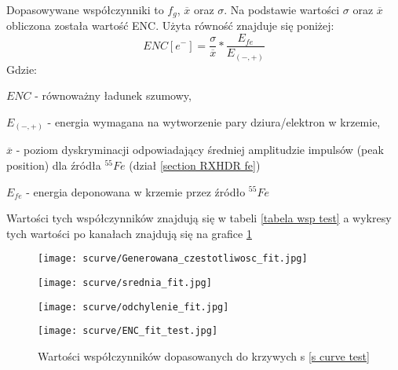 Dopasowywane współczynniki to $f_g$, $\overline{x}$ oraz $\sigma$. Na podstawie wartości $\sigma$ oraz $\overline{x}$ obliczona została wartość ENC. Użyta równość znajduje się poniżej:
\begin{equation}
        ENC [e^-] = \frac{\sigma}{\overline{x}} * \frac{E_{fe}}{E_{(-,+)}}
\end{equation}
Gdzie:
\begin{description}
        \item $ENC$  - równoważny ładunek szumowy,
        \item $E_{(-,+)}$ - energia wymagana na wytworzenie pary dziura/elektron w krzemie,
        \item $\overline{x}$ - poziom dyskryminacji odpowiadający średniej amplitudzie impulsów (peak position) dla źródła ${}^{55}Fe$ (dział \ref{section RXHDR fe})
        \item $E_{fe}$ -  energia deponowana w krzemie przez źródło ${}^{55}Fe$
\end{description}

Wartości tych współczynników znajdują się w tabeli \ref{tabela wsp test} a wykresy tych wartości po kanałach znajdują się na grafice \ref{test fit wsp wyk} 

\begin{figure}
        \begin{multicols}{2}
                \texttt{[image: scurve/Generowana\_czestotliwosc\_fit.jpg]} \par
                \texttt{[image: scurve/srednia\_fit.jpg]} \par       
        \end{multicols} \hfill
        \begin{multicols}{2}
                \texttt{[image: scurve/odchylenie\_fit.jpg]} \par
                \texttt{[image: scurve/ENC\_fit\_test.jpg]} \par
        \end{multicols}
        \caption{Wartości współczynników dopasowanych do krzywych s \ref{s curve test}}
        \label{test fit wsp wyk}
\end{figure}


